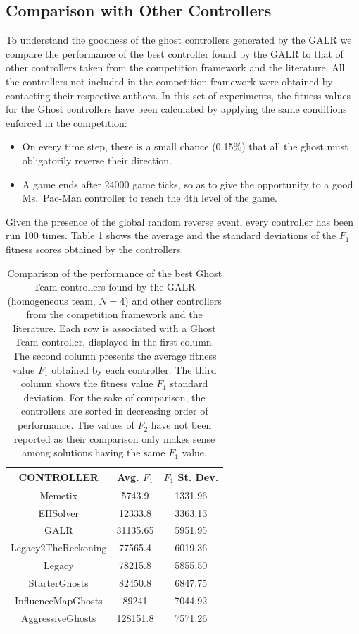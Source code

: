 \documentclass[journal]{IEEEtran}
\begin{document}
\subsection{Comparison with Other Controllers}
To understand the goodness of the ghost controllers generated by the GALR we compare the performance of the best controller found by the GALR to that of other controllers taken from the competition framework and the literature. All the controllers not included in the competition framework were obtained by contacting their respective authors. In this set of experiments, the fitness values for the Ghost controllers have been calculated by applying the same conditions enforced in the competition:
\begin{itemize}
\item On every time step, there is a small chance (0.15\%) that all the ghost must obligatorily reverse their direction.
\item A game ends after 24000 game ticks, so as to give the opportunity to a good Ms.\ Pac-Man controller to reach the 4th level of the game.
\end{itemize}

Given the presence of the global random reverse event, every controller has been run 100 times. Table \ref{tab:summary_others} shows the average and the standard deviations of the $F_1$ fitness scores obtained by the controllers.

\begin{table} [!t]
\caption{Comparison of the performance of the best Ghost Team controllers found by the GALR (homogeneous team, $N=4$) and other controllers from the competition framework and the literature. Each row is associated with a Ghost Team controller, displayed in the first column. The second column presents the average fitness value $F_1$ obtained by each controller. The third column shows the fitness value $F_1$ standard deviation. For the sake of comparison, the controllers are sorted in decreasing order of performance. The values of $F_2$ have not been reported as their comparison only makes sense among solutions having the same $F_1$ value.}
\label{tab:summary_others}
\centering
\begin{tabular}{|c|c|c|}
\hline 
CONTROLLER & Avg. $F_1$ & $F_1$ St. Dev.\tabularnewline
\hline  
Memetix & 5743.9 & 1331.96\tabularnewline
\hline 
EIISolver & 12333.8 & 3363.13\tabularnewline
\hline 
GALR & 31135.65 & 5951.95\tabularnewline
\hline 
Legacy2TheReckoning & 77565.4 & 6019.36\tabularnewline
\hline 
Legacy & 78215.8 & 5855.50\tabularnewline
\hline 
StarterGhosts & 82450.8 & 6847.75\tabularnewline
\hline 
InfluenceMapGhosts \cite{Svensson2012} & 89241 & 7044.92\tabularnewline
\hline 
AggressiveGhosts & 128151.8 & 7571.26\tabularnewline
\hline 
\end{tabular}
\end{table}
\end{document}
